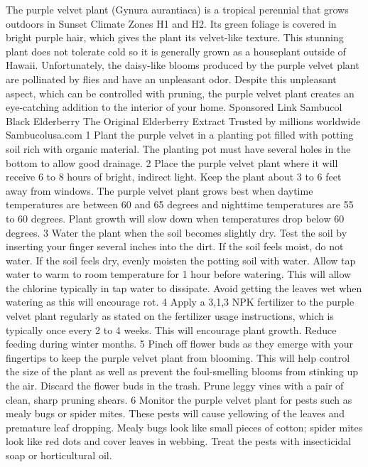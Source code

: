 \documentclass{book}
\begin{document}
The purple velvet plant (Gynura aurantiaca) is a tropical perennial that grows outdoors in Sunset Climate Zones H1 and H2. Its green foliage is covered in bright purple hair, which gives the plant its velvet-like texture. This stunning plant does not tolerate cold so it is generally grown as a houseplant outside of Hawaii. Unfortunately, the daisy-like blooms produced by the purple velvet plant are pollinated by flies and have an unpleasant odor. Despite this unpleasant aspect, which can be controlled with pruning, the purple velvet plant creates an eye-catching addition to the interior of your home.
Sponsored Link
Sambucol Black Elderberry
The Original Elderberry Extract Trusted by millions worldwide
Sambucolusa.com
1
Plant the purple velvet in a planting pot filled with potting soil rich with organic material. The planting pot must have several holes in the bottom to allow good drainage.
2
Place the purple velvet plant where it will receive 6 to 8 hours of bright, indirect light. Keep the plant about 3 to 6 feet away from windows. The purple velvet plant grows best when daytime temperatures are between 60 and 65 degrees and nighttime temperatures are 55 to 60 degrees. Plant growth will slow down when temperatures drop below 60 degrees.
3
Water the plant when the soil becomes slightly dry. Test the soil by inserting your finger several inches into the dirt. If the soil feels moist, do not water. If the soil feels dry, evenly moisten the potting soil with water. Allow tap water to warm to room temperature for 1 hour before watering. This will allow the chlorine typically in tap water to dissipate. Avoid getting the leaves wet when watering as this will encourage rot.
4
Apply a 3,1,3 NPK fertilizer to the purple velvet plant regularly as stated on the fertilizer usage instructions, which is typically once every 2 to 4 weeks. This will encourage plant growth. Reduce feeding during winter months.
5
Pinch off flower buds as they emerge with your fingertips to keep the purple velvet plant from blooming. This will help control the size of the plant as well as prevent the foul-smelling blooms from stinking up the air. Discard the flower buds in the trash. Prune leggy vines with a pair of clean, sharp pruning shears.
6
Monitor the purple velvet plant for pests such as mealy bugs or spider mites. These pests will cause yellowing of the leaves and premature leaf dropping. Mealy bugs look like small pieces of cotton; spider mites look like red dots and cover leaves in webbing. Treat the pests with insecticidal soap or horticultural oil.
\end{document}
